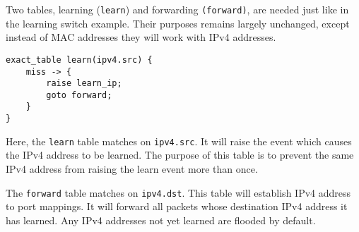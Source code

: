 %
%
%
%
%


Two tables, learning (\texttt{learn}) and forwarding \texttt{(forward)},
are needed just like in the learning switch example. Their purposes
remains largely unchanged, except instead of MAC addresses they
will work with IPv4 addresses.

\begin{codepage}
\begin{lstlisting}
exact_table learn(ipv4.src) {
	miss -> {
		raise learn_ip;
		goto forward;
	}
}
\end{lstlisting}
\end{codepage}

Here, the \texttt{learn} table matches on \texttt{ipv4.src}. 
It will raise the event which causes the IPv4 address to be learned. 
The purpose of this table is to prevent the same IPv4 address from
raising the learn event more than once.

The \texttt{forward} table matches on \texttt{ipv4.dst}. This table will establish IPv4
address to port mappings. It will forward all packets whose destination IPv4
address it has learned. Any IPv4 addresses not yet learned are flooded by
default.

